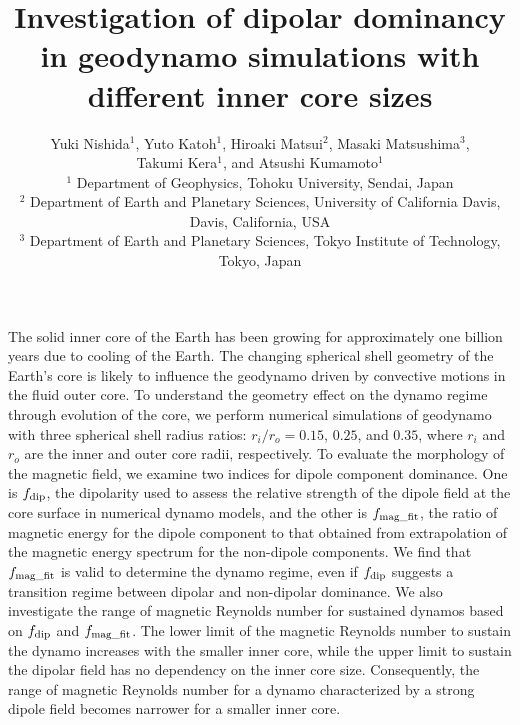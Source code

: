 \documentclass[mreferee]{gji}
\title[Dipolar dominancy in geodynamo with different inner core sizes]
{Investigation of dipolar dominancy in geodynamo simulations with different inner core sizes}
\author[Y. Nishida et al.]
{Yuki Nishida$^1$, Yuto Katoh$^1$, Hiroaki Matsui$^2$, Masaki Matsushima$^3$,\\ 
{\rm \LARGE
Takumi Kera$^1$, and Atsushi Kumamoto$^1$ }\\
  $^1$ Department of Geophysics, Tohoku University, Sendai, Japan \\
  $^2$ Department of Earth and Planetary Sciences, University of California Davis, Davis, California, USA \\
  $^3$ Department of Earth and Planetary Sciences, Tokyo Institute of Technology, Tokyo, Japan
  }
\date{ }
\begin{document}
\maketitle
%
\begin{summary}
The solid inner core of the Earth has been growing for approximately one billion years due to cooling of the Earth.
The changing spherical shell geometry of the Earth’s core is likely to influence the geodynamo driven by convective motions in the fluid outer core.
To understand the geometry effect on the dynamo regime through evolution of the core, we perform numerical simulations of geodynamo with three spherical shell radius ratios: $r_{i}/r_{o} = 0.15$, $0.25$, and $0.35$, where $r_{i}$ and $r_{o}$ are the inner and outer core radii, respectively.
To evaluate the morphology of the magnetic field, we examine two indices for dipole component dominance.
{\color{red}One is $f_{\rm dip}$, the dipolarity used to assess the relative strength of the dipole field at the core surface in numerical dynamo models, and the other is $f_{\rm mag\_fit}$, the ratio of magnetic energy for the dipole component to that obtained from extrapolation of the magnetic energy spectrum for the non-dipole components.}
{\color{red}We find that $f_{\rm mag\_fit}$ is valid to determine the dynamo regime, even if $f_{\rm dip}$ suggests a transition regime between dipolar and non-dipolar dominance.}
We also investigate the range of 
{\color{blue} magnetic Reynolds number}
for sustained dynamos based on $f_{\rm dip}$ and $f_{\rm mag\_fit}$.
{\color{blue} 
The lower limit of the magnetic Reynolds number to sustain the dynamo increases with the smaller inner core, while the upper limit to sustain the dipolar field has no dependency on the inner core size. Consequently, the range of magnetic Reynolds number for a dynamo characterized by a strong dipole field becomes narrower for a smaller inner core.
}
\end{summary}
\end{document}
